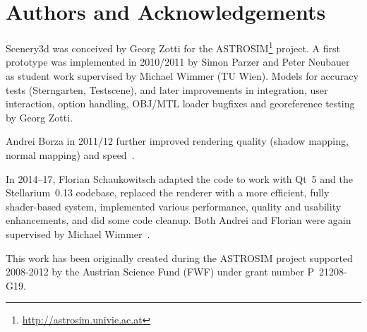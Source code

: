 \section*{Authors and Acknowledgements}
\label{sec:scenery3d:Acknowledgments}


Scenery3d was conceived by Georg Zotti for the
ASTROSIM\footnote{\url{http://astrosim.univie.ac.at}} project. A first
prototype was implemented in 2010/2011 by Simon Parzer and
Peter Neubauer as student work supervised by Michael Wimmer (TU Wien).
Models for accuracy tests (Sterngarten, Testscene), and later
improvements in integration, user interaction,  option handling,
OBJ/MTL loader bugfixes and georeference testing by Georg Zotti.

Andrei Borza in 2011/12 further improved rendering quality (shadow
mapping, normal mapping) and
speed~\citep{Zotti-Neubauer:VSMM2012,Zotti-Neubauer:EuroMed2012,Zotti:2012:SpringerAA}.

In 2014--17,
Florian Schaukowitsch adapted the code to work with Qt~5 and the 
Stellarium~0.13 codebase, replaced the renderer with a more efficient, fully
shader-based system, implemented various performance, quality and usability
enhancements, and did some code cleanup. Both Andrei and Florian were again
supervised by Michael Wimmer~\citep{Zotti:CHNT2015,Zotti:SEAC2015,Zotti:SEAC2017}. %

This work has been originally created during the ASTROSIM project supported 2008-2012 by
the Austrian Science Fund (FWF) under grant number P~21208-G19.

%


